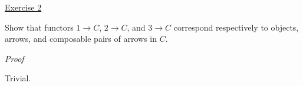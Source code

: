 \noindent
\underline{Exercise 2}
\vspace{2mm}

Show that functors $1 \rightarrow C$, $2 \rightarrow C$, and $3 \rightarrow C$ correspond respectively to objects, arrows, and composable pairs of arrows in $C$.

\vspace{2mm}

\noindent
\emph{Proof}

Trivial. 

\vspace{2mm}
